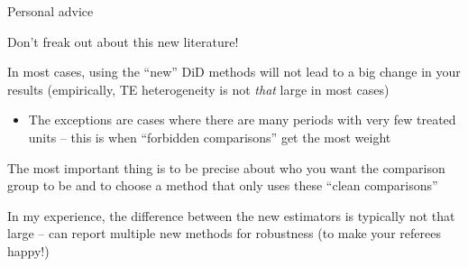 \documentclass[usenames, dvipsnames, aspectratio = 169, 13pt]{beamer}
\newcommand{\backupbegin}{
	\newcounter{finalframe}
	\setcounter{finalframe}{\value{framenumber}}
}
\newcommand{\backupend}{
   \setcounter{framenumber}{\value{finalframe}}
}
\newenvironment{wideitemize}{\itemize\addtolength{\itemsep}{10pt}}{\enditemize}
\begin{document}
\begin{frame}{Personal advice}
    \begin{wideitemize}
        \item
        Don't freak out about this new literature!
        
        \pause 
        \item
        In most cases, using the ``new'' DiD methods will not lead to a big change in your results (empirically, TE heterogeneity is not \textit{that} large in most cases)
            \begin{itemize}
                \item 
                The exceptions are cases where there are many periods with very few treated units -- this is when ``forbidden comparisons'' get the most weight
            \end{itemize}
        
        \pause
        \item
        The most important thing is to be precise about who you want the comparison group to be and to choose a method that only uses these ``clean comparisons''
        
        \pause
        \item
        In my experience, the difference between the new estimators is typically not that large -- can report multiple new methods for robustness (to make your referees happy!)
    \end{wideitemize}
\end{frame}






\backupbegin

\backupend
\end{document}
